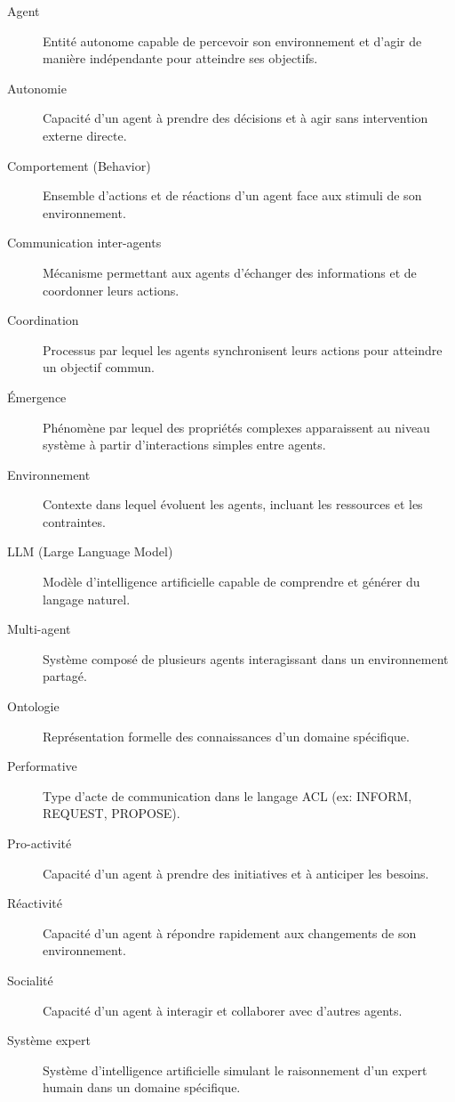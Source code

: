 
\begin{description}
    \item[Agent] Entité autonome capable de percevoir son environnement et d'agir de manière indépendante pour atteindre ses objectifs.
    
    \item[Autonomie] Capacité d'un agent à prendre des décisions et à agir sans intervention externe directe.
    
    \item[Comportement (Behavior)] Ensemble d'actions et de réactions d'un agent face aux stimuli de son environnement.
    
    \item[Communication inter-agents] Mécanisme permettant aux agents d'échanger des informations et de coordonner leurs actions.
    
    \item[Coordination] Processus par lequel les agents synchronisent leurs actions pour atteindre un objectif commun.
    
    \item[Émergence] Phénomène par lequel des propriétés complexes apparaissent au niveau système à partir d'interactions simples entre agents.
    
    \item[Environnement] Contexte dans lequel évoluent les agents, incluant les ressources et les contraintes.
    
    \item[LLM (Large Language Model)] Modèle d'intelligence artificielle capable de comprendre et générer du langage naturel.
    
    \item[Multi-agent] Système composé de plusieurs agents interagissant dans un environnement partagé.
    
    \item[Ontologie] Représentation formelle des connaissances d'un domaine spécifique.
    
    \item[Performative] Type d'acte de communication dans le langage ACL (ex: INFORM, REQUEST, PROPOSE).
    
    \item[Pro-activité] Capacité d'un agent à prendre des initiatives et à anticiper les besoins.
    
    \item[Réactivité] Capacité d'un agent à répondre rapidement aux changements de son environnement.
    
    \item[Socialité] Capacité d'un agent à interagir et collaborer avec d'autres agents.
    
    \item[Système expert] Système d'intelligence artificielle simulant le raisonnement d'un expert humain dans un domaine spécifique.
\end{description}